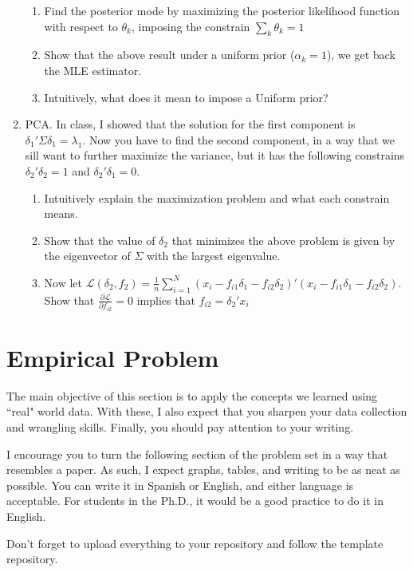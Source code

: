 \documentclass[12pt,onecolumn]{article}
\begin{document}
\begin{enumerate}
\begin{enumerate}
  \item Find the posterior mode by maximizing the posterior likelihood function with respect to $\theta_k$, imposing the constrain  $\sum_k\theta_k=1$
  \item Show that the above result under a uniform prior ($\alpha_k=1$), we get back the MLE estimator. 
  \item Intuitively, what does it mean to impose a Uniform prior?
\end{enumerate}
\item PCA. In class, I showed that the solution for the first component is $\delta_1'\Sigma\delta_1=\lambda_1$. Now you have to find the second component, in a way that we sill want to further maximize the variance, but it has the following constrains $\delta_2'\delta_2=1$ and $\delta_2'\delta_1=0$.
\begin{enumerate}
  \item Intuitively explain the maximization problem and what each constrain means.
  \item Show that the value of $\delta_2$ that minimizes the above problem is given by the eigenvector of $\Sigma$ with the largest eigenvalue.
  \item Now let $\mathcal{L}(\delta_2,f_2)=\frac{1}{n}\sum_{i=1}^N(x_i-f_{i1}\delta_1-f_{i2}\delta_2)'(x_i-f_{i1}\delta_1-f_{i2}\delta_2)$. Show that $\frac{\partial \mathcal{L}}{ \partial f_{i2}} =0$ implies that $f_{i2}=\delta_2'x_i$

\end{enumerate}
\end{enumerate}


\section{Empirical Problem}



The main objective of this section is to apply the concepts we learned using ``real" world data. With these, I also expect that you sharpen your data collection and wrangling skills. Finally, you should pay attention to your writing.

I encourage you to turn the following section of the problem set in a way that resembles a paper. As such, I expect graphs, tables, and writing to be as neat as possible. You can write it in Spanish or English, and either language is acceptable. For students in the Ph.D., it would be a good practice to do it in English.

Don't forget to upload everything to your repository and follow the template repository. 
\end{document}

